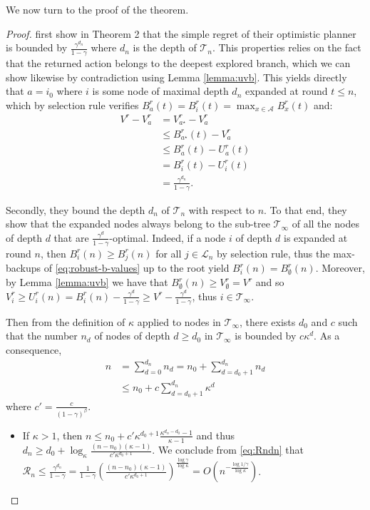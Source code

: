 \documentclass{article}
\begin{document}
We now turn to the proof of the theorem.

\begin{proof}
	\citet{Hren2008} first show in Theorem 2 that the simple regret of their optimistic planner is bounded by $\frac{\gamma^{d_n}}{1 - \gamma}$ where $d_n$ is the depth of $\mathcal{T}_n$. This properties relies on the fact that the returned action belongs to the deepest explored branch, which we can show likewise by contradiction using Lemma \ref{lemma:uvb}. This yields directly that $a = i_0$ where $i$ is some node of maximal depth $d_n$ expanded at round $t\leq n$, which by selection rule verifies $B_a^r(t) = B_i^r(t) = \max_{x\in\mathcal{A}} B_x^r(t)$ and:
	\begin{align}
	\label{eq:Rndn}
	V^r - V_a^r &= V_{a^{\star}}^r - V_a^r \\
	&\leq B_{a^{\star}}^r(t) - V_a^r \\
	&\leq B_{a}^r(t) - U_a^r(t) \\
	&= B_{i}^r(t) - U_i^r(t) \\
	&= \frac{\gamma^{d_n}}{1-\gamma}.
	\end{align}
	
	Secondly, they bound the depth $d_n$ of $\mathcal{T}_n$ with respect to $n$. To that end, they show that the expanded nodes always belong to the sub-tree $\mathcal{T}_\infty$ of all the nodes of depth $d$ that are $\frac{\gamma^d}{1-\gamma}$-optimal. Indeed, if a node $i$ of depth $d$ is expanded at round $n$, then $B_i^r(n) \geq B_j^r(n)$ for all $j\in \mathcal{L}_n$ by selection rule, thus the max-backups of \eqref{eq:robust-b-values} up to the root yield $B^r_i(n) = B_\emptyset^r(n)$. Moreover, by Lemma \ref{lemma:uvb} we have that $B_\emptyset^r(n) \geq V_\emptyset^r = V^r$ and so $V_i^r \geq U_i^r(n) = B_i^r(n) - \frac{\gamma^d}{1-\gamma} \geq V^r - \frac{\gamma^d}{1-\gamma}$, thus $i \in \mathcal{T}_\infty$.
	
	Then from the definition of $\kappa$ applied to nodes in $\mathcal{T}_\infty$, there exists $d_0$ and $c$ such that the number $n_d$ of nodes of depth $d \geq d_0$ in $\mathcal{T}_\infty$ is bounded by $c\kappa^d$. As a consequence, 
	\begin{eqnarray*}
		n &= \sum_{d=0}^{d_n} n_d = n_0 + \sum_{d=d_0+1}^{d_n} n_d \\
		&\leq n_0 + c\sum_{d={d_0+1}}^{d_n} \kappa^d
	\end{eqnarray*}
	where $c'=\frac{c}{(1-\gamma)^\beta}$.
	
	\begin{itemize}
		\item If $\kappa > 1$, then $n \leq n_0 + c'\kappa^{d_0+1}\frac{\kappa^{d_n-d_0}-1}{\kappa-1}$ and thus $d_n \geq d_0 + \log_\kappa \frac{(n-n_0)(\kappa - 1)}{c'\kappa^{d_0+1}}$.
		We conclude from \eqref{eq:Rndn} that $\mathcal{R}_n \leq \frac{\gamma^{d_n}}{1-\gamma} = \frac{1}{1-\gamma} \left( \frac{(n-n_0)(\kappa - 1)}{c'\kappa^{d_0+1}} \right)^\frac{\log \gamma}{\log \kappa} = O\left(n^{-\frac{\log 1/\gamma}{\log \kappa}}\right)$.
		

\end{itemize}
\end{proof}
\end{document}
